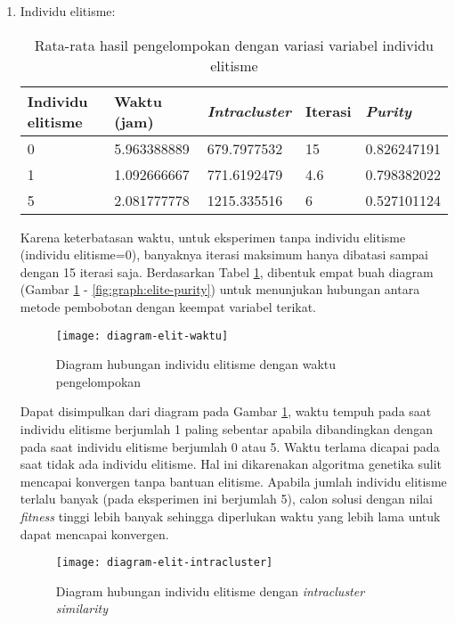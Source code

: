 \begin{enumerate}
		\newpage
		\item Individu elitisme:
		\begin{table}[H]
			\centering
			\caption{Rata-rata hasil pengelompokan dengan variasi variabel individu elitisme}
			\begin{tabular}{|l|l|l|l|l|} \hline
				Individu elitisme & Waktu (jam) & \textit{Intracluster} & Iterasi & \textit{Purity} \\ \hline
				0 & 5.963388889 & 679.7977532 & 15  & 0.826247191 \\ \hline
				1 & 1.092666667 & 771.6192479 & 4.6 & 0.798382022 \\ \hline
				5 & 2.081777778 & 1215.335516 & 6   & 0.527101124 \\ \hline
			\end{tabular}
			\label{tbl:exp-elitism}
		\end{table}
		
		Karena keterbatasan waktu, untuk eksperimen tanpa individu elitisme (individu elitisme=0), banyaknya iterasi maksimum hanya dibatasi sampai dengan 15 iterasi saja. Berdasarkan Tabel \ref{tbl:exp-elitism}, dibentuk empat buah diagram (Gambar \ref{fig:graph:elite-time} - \ref{fig:graph:elite-purity}) untuk menunjukan hubungan antara metode pembobotan dengan keempat variabel terikat.
		
		\begin{figure}[H]
			\centering
			\texttt{[image: diagram-elit-waktu]}
			\caption{Diagram hubungan individu elitisme dengan waktu pengelompokan}
			\label{fig:graph:elite-time}
		\end{figure}
		
		Dapat disimpulkan dari diagram pada Gambar \ref{fig:graph:elite-time}, waktu tempuh pada saat individu elitisme berjumlah 1 paling sebentar apabila dibandingkan dengan pada saat individu elitisme berjumlah 0 atau 5. Waktu terlama dicapai pada saat tidak ada individu elitisme. Hal ini dikarenakan algoritma genetika sulit mencapai konvergen tanpa bantuan elitisme. Apabila jumlah individu elitisme terlalu banyak (pada eksperimen ini berjumlah 5), calon solusi dengan nilai \textit{fitness} tinggi lebih banyak sehingga diperlukan waktu yang lebih lama untuk dapat mencapai konvergen.
		
		\begin{figure}[H]
			\centering
			\texttt{[image: diagram-elit-intracluster]}
			\caption{Diagram hubungan individu elitisme dengan \textit{intracluster similarity}}
			\label{fig:graph:elite-intra}
		\end{figure}
		

\end{enumerate}

